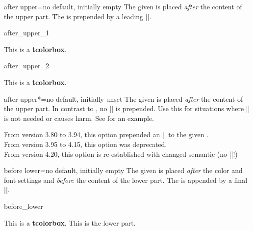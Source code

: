 \begin{docTcbKey}[][doc updated=2016-10-21]{after upper}{=}{no default, initially empty}
  The given  is placed \emph{after} the content of the upper part.
  The  is prepended by a leading |\unskip|.

\begin{exdispExample}{after_upper_1}

\begin{tcolorbox}[title=My title]
This is a \textbf{tcolorbox}.
\end{tcolorbox}
\end{exdispExample}

\begin{exdispExample}{after_upper_2}
\begin{tcolorbox}[before upper=\flqq,after upper=\frqq,
  colback=red!5!white,colframe=red!75!black]
This is a \textbf{tcolorbox}.
\end{tcolorbox}
\end{exdispExample}
\end{docTcbKey}


\begin{docTcbKey}[][doc new and updated={2016-10-21}{2019-02-28}]{after upper*}{=}{no default, initially unset}
  The given  is placed \emph{after} the content of the upper part.
  In contrast to , no |\unskip| is prepended.
  Use this for situations where |\unskip| is not needed or causes harm.
  See  for an example.

\begin{marker}
  From version 3.80 to 3.94, this option prepended an |\unskip| to the given .\\
  From version 3.95 to 4.15, this option was deprecated.\\
  From version 4.20, this option is re-established with changed semantic (no |\unskip|!)
\end{marker}
\end{docTcbKey}


\clearpage
\begin{docTcbKey}{before lower}{=}{no default, initially empty}
  The given  is placed \emph{after} the color and font settings
  and \emph{before} the content of the lower part.
  The  is appended by a final |\ignorespaces|.
\begin{exdispExample}{before_lower}

\begin{tcolorbox}
This is a \textbf{tcolorbox}.
\tcblower
This is the lower part.
\end{tcolorbox}
\end{exdispExample}
\end{docTcbKey}


